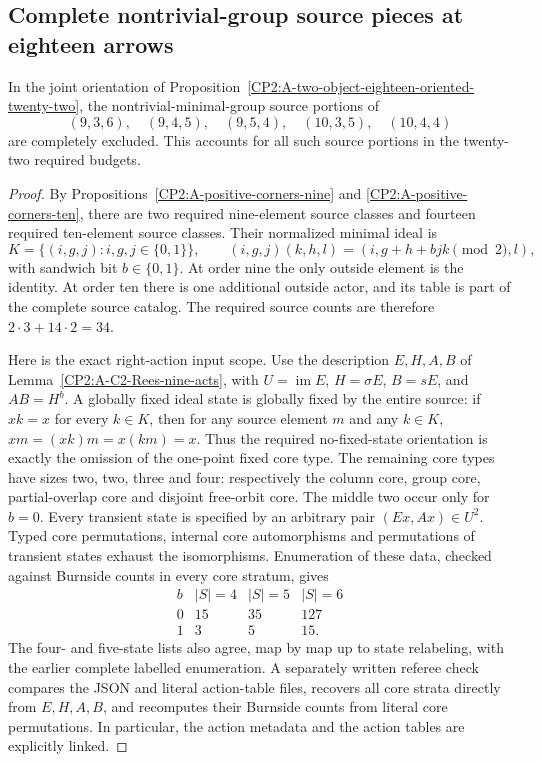 \subsection{Complete nontrivial-group source pieces at eighteen arrows}

\begin{proposition}
\label{CP2:A-C2-source-eighteen-complete}
In the joint orientation of
Proposition~\ref{CP2:A-two-object-eighteen-oriented-twenty-two},
the nontrivial-minimal-group source portions of
\[
 (9,3,6),\quad(9,4,5),\quad(9,5,4),\quad
 (10,3,5),\quad(10,4,4)
\]
are completely excluded.  This accounts for all such source
portions in the twenty-two required budgets.
\end{proposition}
\begin{proof}
By Propositions~\ref{CP2:A-positive-corners-nine} and
\ref{CP2:A-positive-corners-ten}, there are two required
nine-element source classes and fourteen required ten-element
source classes.  Their normalized minimal ideal is
\[
 K=\{(i,g,j):i,g,j\in\{0,1\}\},\qquad
 (i,g,j)(k,h,l)=(i,g+h+bjk\pmod2,l),
\]
with sandwich bit $b\in\{0,1\}$.  At order nine the only
outside element is the identity.  At order ten there is one
additional outside actor, and its table is part of the
complete source catalog.  The required source counts are
therefore $2\cdot3+14\cdot2=34$.

Here is the exact right-action input scope.  Use the
description $E,H,A,B$ of
Lemma~\ref{CP2:A-C2-Rees-nine-acts}, with
$U=\operatorname{im}E$, $H=\sigma E$, $B=sE$, and
$AB=H^b$.  A globally fixed ideal state is globally fixed
by the entire source: if $xk=x$ for every $k\in K$, then
for any source element $m$ and any $k\in K$,
$xm=(xk)m=x(km)=x$.
Thus the required no-fixed-state orientation is exactly
the omission of the one-point fixed core type.
The remaining core types have sizes two, two, three and
four: respectively the column core, group core,
partial-overlap core and disjoint free-orbit core.
The middle two occur only for $b=0$.
Every transient state is specified by an arbitrary pair
$(Ex,Ax)\in U^2$.  Typed core permutations, internal core
automorphisms and permutations of transient states exhaust
the isomorphisms.  Enumeration of these data, checked
against Burnside counts in every core stratum, gives
\[
\begin{array}{c|rrr}
 b&|S|=4&|S|=5&|S|=6\\\hline
 0&15&35&127\\
 1&3&5&15.
\end{array}
\]
The four- and five-state lists also agree, map by map up to
state relabeling, with the earlier complete labelled
enumeration.  A separately written referee check compares
the JSON and literal action-table files, recovers all core
strata directly from $E,H,A,B$, and recomputes their
Burnside counts from literal core permutations.  In
particular, the action metadata and the action tables are
explicitly linked.


\end{proof}
